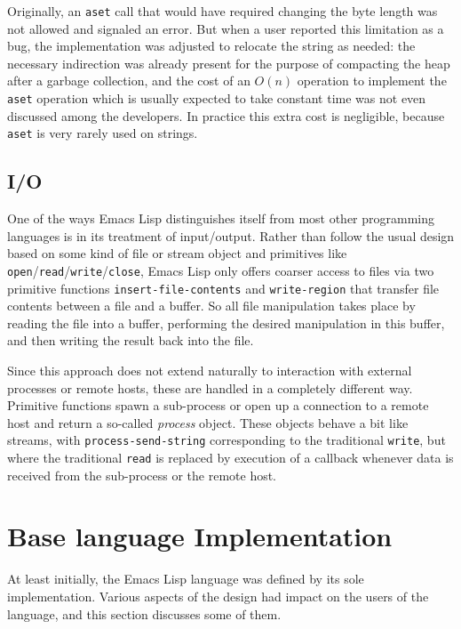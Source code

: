 \documentclass[format=acmsmall, review]{acmart}
\newcommand \Elisp {Emacs Lisp}
\begin{document}
Originally, an \texttt{aset} call that would have required changing the
byte length was not allowed and signaled an error.  But when a user reported
this limitation as a bug, the implementation was adjusted to relocate the
string as needed: the necessary indirection was already present for the
purpose of compacting the heap after a garbage collection, and the cost of
an $O(n)$ operation to implement the \texttt{aset} operation which is
usually expected to take constant time was not even discussed among the
developers. In practice this extra cost is negligible, because
\texttt{aset} is very rarely used on strings.

\subsection{I/O}

One of the ways \Elisp{} distinguishes itself from most other programming
languages is in its treatment of input/output. Rather than follow the usual
design based on some kind of file or stream object and primitives like
\texttt{open}/\texttt{read}/\texttt{write}/\texttt{close}, \Elisp{} only
offers coarser access to files via two primitive functions
\texttt{insert-file-contents} and \texttt{write-region} that transfer file
contents between a file and a buffer.  So all file manipulation takes place
by reading the file into a buffer, performing the desired manipulation in
this buffer, and then writing the result back into the file.

Since this approach does not extend naturally to interaction with external
processes or remote hosts, these are handled in a completely different way.
Primitive functions spawn a sub-process or open up
a connection to a remote host and return a so-called \emph{process} object.
These objects behave  a bit like streams, with \texttt{process-send-string}
corresponding to the traditional \texttt{write}, but where the traditional
\texttt{read} is replaced by execution of a callback whenever data is
received from the sub-process or the remote host.

\section{Base language Implementation}
\label{sec:base-language-implementation}

At least initially, the \Elisp{} language was defined by its sole
implementation.  Various aspects of the design had impact on the users of the
language, and this section discusses some of them.
\end{document}
